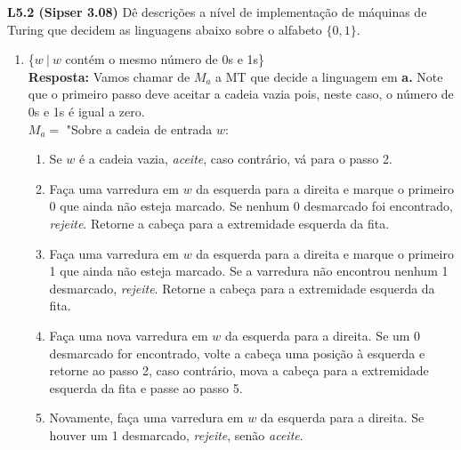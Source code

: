 
\noindent \textbf{L5.2 (Sipser 3.08)} Dê descrições a nível de implementação de máquinas de Turing que decidem as linguagens abaixo sobre o alfabeto $\{0, 1\}$.
\begin{enumerate}[label={\textbf{\alph*.}}]
\item \{$w\ |\ w$ contém o mesmo número de 0s e 1s\}\\[3pt]
\textbf{Resposta: } Vamos chamar de $M_a$ a MT que decide a linguagem em \textbf{a.} Note que o primeiro passo deve aceitar a cadeia vazia pois, neste caso, o número de 0s e 1s é igual a zero.\\[3pt]
$M_a = $ "Sobre a cadeia de entrada $w$:
\begin{enumerate}[label={\textbf{\arabic*.}}, leftmargin=1in]
\item Se $w$ é a cadeia vazia, \textit{aceite}, caso contrário, vá para o passo 2.
\item Faça uma varredura em $w$ da esquerda para a direita e marque o primeiro 0 que ainda não esteja marcado. Se nenhum 0 desmarcado foi encontrado, \textit{rejeite}. Retorne a cabeça para a extremidade esquerda da fita.
\item Faça uma varredura em $w$ da esquerda para a direita e marque o primeiro 1 que ainda não esteja marcado. Se a varredura não encontrou nenhum 1 desmarcado, \textit{rejeite}. Retorne a cabeça para a extremidade esquerda da fita.
\item Faça uma nova varredura em $w$ da esquerda para a direita. Se um 0 desmarcado for encontrado, volte a cabeça uma posição à esquerda e retorne ao passo 2, caso contrário, mova a cabeça para a extremidade esquerda da fita e passe ao passo 5.
\item Novamente, faça uma varredura em $w$ da esquerda para a direita. Se houver um 1 desmarcado, \textit{rejeite}, senão \textit{aceite}.
\end{enumerate}


\end{enumerate}
